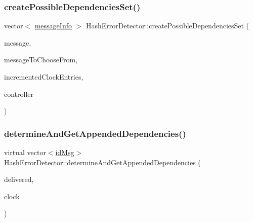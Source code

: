 \mbox{\label{class_hash_error_detector_ae8605d778886baa20648a9f5955c5943}} 
\subsubsection{\texorpdfstring{create\+Possible\+Dependencies\+Set()}{createPossibleDependenciesSet()}}
{\footnotesize\ttfamily vector$<$ \hyperlink{structures_8h_a7e7bdc1d2fff8a9436f2f352b2711ed6}{message\+Info} $>$ Hash\+Error\+Detector\+::create\+Possible\+Dependencies\+Set (\begin{DoxyParamCaption}\item[{const \hyperlink{structures_8h_a7e7bdc1d2fff8a9436f2f352b2711ed6}{message\+Info} \&}]{message,  }\item[{const vector$<$ \hyperlink{structures_8h_a7e7bdc1d2fff8a9436f2f352b2711ed6}{message\+Info} $>$ \&}]{message\+To\+Choose\+From,  }\item[{const vector$<$ unsigned int $>$ \&}]{incremented\+Clock\+Entries,  }\item[{\hyperlink{class_controller}{Controller} $\ast$}]{controller }\end{DoxyParamCaption})}

\mbox{\label{class_hash_error_detector_ae45353331e29b50a0aa2fc6dd540ed4e}} 
\subsubsection{\texorpdfstring{determine\+And\+Get\+Appended\+Dependencies()}{determineAndGetAppendedDependencies()}}
{\footnotesize\ttfamily virtual vector$<$\hyperlink{structures_8h_a83a1d9a070efa5341da84cfd8e28d3e5}{id\+Msg}$>$ Hash\+Error\+Detector\+::determine\+And\+Get\+Appended\+Dependencies (\begin{DoxyParamCaption}\item[{const vector$<$ \hyperlink{structures_8h_a7e7bdc1d2fff8a9436f2f352b2711ed6}{message\+Info} $>$ \&}]{delivered,  }\item[{const \hyperlink{class_probabilistic_clock}{Probabilistic\+Clock} \&}]{clock }\end{DoxyParamCaption})\hspace{0.3cm}{\ttfamily [pure virtual]}}



